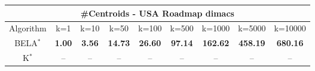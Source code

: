 \begin{tabular}{c|cccccccc}\toprule
\multicolumn{9}{c}{#Centroids - USA Roadmap dimacs}\\ \midrule
Algorithm & k=1 & k=10 & k=50 & k=100 & k=500 & k=1000 & k=5000 & k=10000 \\ \midrule
BELA$^*$ & \textbf{1.00} & \textbf{3.56} & \textbf{14.73} & \textbf{26.60} & \textbf{97.14} & \textbf{162.62} & \textbf{458.19} & \textbf{680.16} \\
K$^*$ & -- & -- & -- & -- & -- & -- & -- & -- \\ \bottomrule 
\end{tabular}
